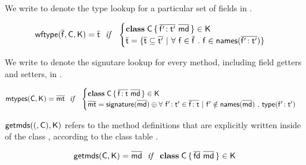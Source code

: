 \documentclass[a4paper,USenglish]{tex/lipics-v2016}
\begin{document}
We write \wftype{\b\f}\C\K to denote the type lookup for a particular set of fields in \C.

\begin{equation*}
\wftype{\b\f}\C\K = \b\t ~~\mathit{if}~~ \begin{cases}

 \Class \C {\b{\Ftype\fp\tp}}{\b\md} \in \K\\
 \b\t = \{ \b\t \subseteq \b\tp ~|~ \forall~ \f \in \b\f ~.~ \f \in \names{\b{\Ftype\fp\tp}} \} \\
 
\end{cases}
\end{equation*}


We write \classoff\C\K to denote the signutare lookup for every method, including field getters and setters, in \C.

\begin{equation*}
\classoff\C\K = \b\mt ~~\mathit{if}~~ \begin{cases}

 \Class \C {\b{\Ftype\f\t}}{\b\md} \in \K\\
 \b\mt = \sign{\b\md} \oplus \forall ~\Ftype\fp\tp \in \b{\Ftype\f\t} ~|~ \fp \notin \names{\b\md} ~.~ \typez{\Ftype\fp\tp}

\end{cases}
\end{equation*}

$\getmds(\C,\K)$ refers to the method definitions that are explicitly written inside of the class \C, according to the class table \K.

\begin{equation*}
\getmds\C\K = \b\md ~~\mathit{if}~~ \Class\C{\b{\fd}}{\b\md} \in \K
\end{equation*}

\hrulefill

\begin{mathpar}
\end{mathpar}

\hrulefill

\end{document}
